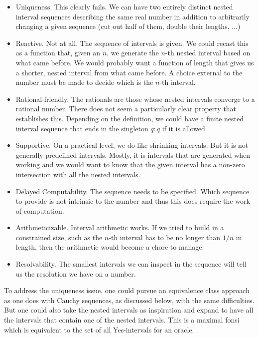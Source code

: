 \documentclass[12pt]{article}
\begin{document}
\begin{itemize}
    \item Uniqueness. This clearly fails. We can have two entirely distinct nested interval sequences describing the same real number in addition to arbitrarily changing a given sequence (cut out half of them, double their lengths, ...)
    \item Reactive. Not at all. The sequence of intervals is given. We could recast this as a function that, given an $n$, we generate the $n$-th nested interval based on what came before. We would probably want a function of length that gives us a shorter, nested interval from what came before. A choice external to the number must be made to decide which is the $n$-th interval. 
    \item Rational-friendly. The rationals are those whose nested intervals converge to a rational number. There does not seem a particularly clear property that establishes this. Depending on the definition, we could have a finite nested interval sequence that ends in the singleton $q:q$ if it is allowed. 
    \item Supportive. On a practical level, we do like shrinking intervals. But it is not generally predefined intervals. Mostly, it is intervals that are generated when working and we would want to know that the given interval has a non-zero intersection with all the nested intervals. 
    \item Delayed Computability. The sequence needs to be specified. Which sequence to provide is not intrinsic to the number and thus this does require the work of computation.  
    \item Arithmeticizable. Interval arithmetic works. If we tried to build in a constrained size, such as the $n$-th interval has to be no longer than $1/n$ in length, then the arithmetic would become a chore to manage. 
    \item Resolvability. The smallest intervals we can inspect in the sequence will tell us the resolution we have on a number. 
\end{itemize}

To address the uniqueness issue, one could pursue an equivalence class approach as one does with Cauchy sequences, as discussed below, with the same difficulties. But one could also take the nested intervals as inspiration and expand to have all the intervals that contain one of the nested intervals. This is a maximal fonsi which is equivalent to the set of all Yes-intervals for an oracle. 
\end{document}

